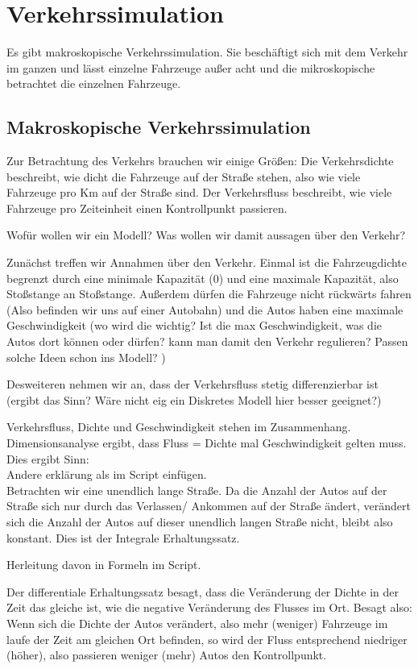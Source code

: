 \documentclass[]{article}
\begin{document}
\section{Verkehrssimulation}
Es gibt makroskopische Verkehrssimulation. Sie beschäftigt sich mit dem Verkehr im ganzen und lässt einzelne Fahrzeuge außer acht und die mikroskopische betrachtet die einzelnen Fahrzeuge. 

\subsection{Makroskopische Verkehrssimulation}
Zur Betrachtung des Verkehrs brauchen wir einige Größen: Die Verkehrsdichte beschreibt, wie dicht die Fahrzeuge auf der Straße stehen, also wie viele Fahrzeuge pro Km auf der Straße sind. Der Verkehrsfluss beschreibt, wie viele Fahrzeuge pro Zeiteinheit einen Kontrollpunkt passieren. 

Wofür wollen wir ein Modell?  Was wollen wir damit aussagen über den Verkehr? 

Zunächst treffen wir Annahmen über den Verkehr. Einmal ist die Fahrzeugdichte begrenzt durch eine minimale Kapazität (0) und eine maximale Kapazität, also Stoßstange an Stoßstange. Außerdem dürfen die Fahrzeuge nicht rückwärts fahren (Also befinden wir uns auf einer Autobahn) und die Autos haben eine maximale Geschwindigkeit (wo wird die wichtig? Ist die max Geschwindigkeit, was die Autos dort können oder dürfen? kann man damit den Verkehr regulieren? Passen solche Ideen schon ins Modell? )

Desweiteren nehmen wir an, dass der Verkehrsfluss stetig differenzierbar ist (ergibt das Sinn? Wäre nicht eig ein Diskretes Modell hier besser geeignet?)

Verkehrsfluss, Dichte und Geschwindigkeit stehen im Zusammenhang. Dimensionsanalyse ergibt, dass Fluss = Dichte mal Geschwindigkeit gelten muss. Dies ergibt Sinn:  \\

Andere erklärung als im Script einfügen. \\

Betrachten wir eine unendlich lange Straße. Da die Anzahl der Autos auf der Straße sich nur durch das Verlassen/ Ankommen auf der Straße ändert, verändert sich die Anzahl der Autos auf dieser unendlich langen Straße nicht, bleibt also konstant. Dies ist der Integrale Erhaltungssatz. 

Herleitung davon in Formeln im Script. 

Der differentiale Erhaltungssatz besagt, dass die Veränderung der Dichte in der Zeit das gleiche ist, wie die negative Veränderung des Flusses im Ort. Besagt also: Wenn sich die Dichte der Autos verändert, also mehr (weniger) Fahrzeuge im laufe der Zeit am gleichen Ort befinden, so wird der Fluss entsprechend niedriger (höher), also passieren weniger (mehr) Autos den Kontrollpunkt. 
\end{document}
